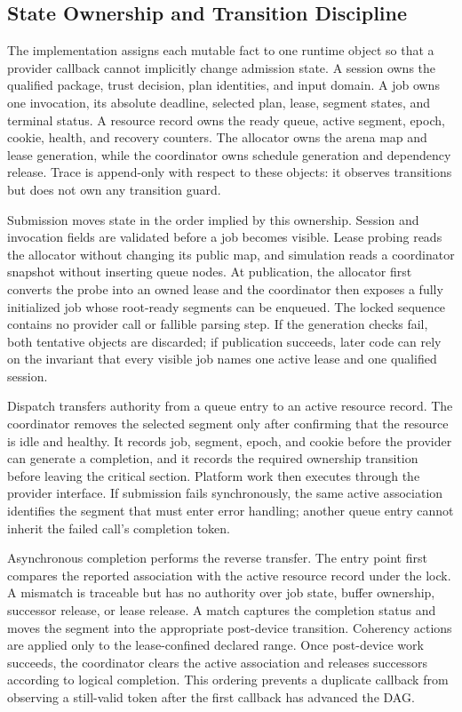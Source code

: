 \documentclass[lettersize,journal]{IEEEtran}
\begin{document}
\subsection{State Ownership and Transition Discipline}
The implementation assigns each mutable fact to one runtime object so that a
provider callback cannot implicitly change admission state. A session owns the
qualified package, trust decision, plan identities, and input domain. A job
owns one invocation, its absolute deadline, selected plan, lease, segment
states, and terminal status. A resource record owns the ready queue, active
segment, epoch, cookie, health, and recovery counters. The allocator owns the
arena map and lease generation, while the coordinator owns schedule generation
and dependency release. Trace is append-only with respect to these objects: it
observes transitions but does not own any transition guard.

Submission moves state in the order implied by this ownership. Session and
invocation fields are validated before a job becomes visible. Lease probing
reads the allocator without changing its public map, and simulation reads a
coordinator snapshot without inserting queue nodes. At publication, the
allocator first converts the probe into an owned lease and the coordinator then
exposes a fully initialized job whose root-ready segments can be enqueued. The
locked sequence contains no provider call or fallible parsing step. If the
generation checks fail, both tentative objects are discarded; if publication
succeeds, later code can rely on the invariant that every visible job names one
active lease and one qualified session.

Dispatch transfers authority from a queue entry to an active resource record.
The coordinator removes the selected segment only after confirming that the
resource is idle and healthy. It records job, segment, epoch, and cookie before
the provider can generate a completion, and it records the required ownership
transition before leaving the critical section. Platform work then executes
through the provider interface. If submission fails synchronously, the same
active association identifies the segment that must enter error handling;
another queue entry cannot inherit the failed call's completion token.

Asynchronous completion performs the reverse transfer. The entry point first
compares the reported association with the active resource record under the
lock. A mismatch is traceable but has no authority over job state, buffer
ownership, successor release, or lease release. A match captures the completion
status and moves the segment into the appropriate post-device transition.
Coherency actions are applied only to the lease-confined declared range. Once
post-device work succeeds, the coordinator clears the active association and
releases successors according to logical completion. This ordering prevents a
duplicate callback from observing a still-valid token after the first callback
has advanced the DAG.
\end{document}
